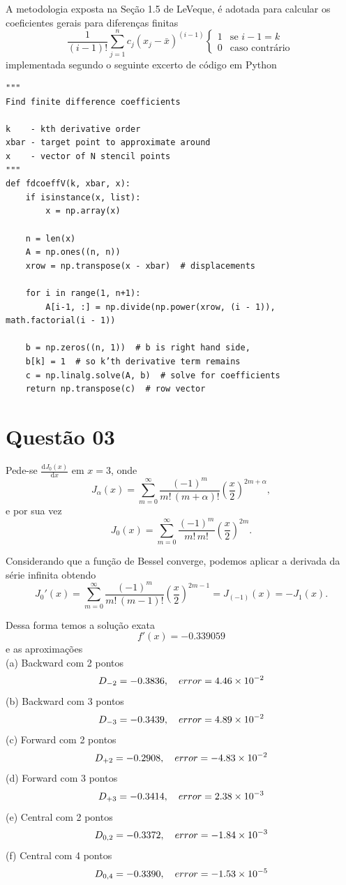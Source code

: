 \documentclass{article}
\begin{document}
A metodologia exposta na Seção 1.5 de LeVeque\cite{leveque}, é adotada para calcular os coeficientes gerais para diferenças finitas
\begin{equation}\label{eq:leveque_coeffs}
\frac{1}{(i-1)!}\sum_{j=1}^n c_j(x_j-\bar{x})^{(i-1)}\begin{cases}
			1 &\text{se $i-1 = k$} \\
                        0 &\text{caso contrário}\
                    \end{cases}
\end{equation}
implementada segundo o seguinte excerto de código em Python
\begin{lstlisting}
"""
Find finite difference coefficients

k    - kth derivative order
xbar - target point to approximate around
x    - vector of N stencil points
"""
def fdcoeffV(k, xbar, x):
    if isinstance(x, list):
        x = np.array(x)

    n = len(x)
    A = np.ones((n, n))
    xrow = np.transpose(x - xbar)  # displacements

    for i in range(1, n+1):
        A[i-1, :] = np.divide(np.power(xrow, (i - 1)), math.factorial(i - 1))

    b = np.zeros((n, 1))  # b is right hand side,
    b[k] = 1  # so k’th derivative term remains
    c = np.linalg.solve(A, b)  # solve for coefficients
    return np.transpose(c)  # row vector

\end{lstlisting}

\section{Questão 03}

Pede-se $\frac{\mathrm{d}J_0(x)}{\mathrm{d}x}$ em $x=3$, onde 
\[J_\alpha(x) = \sum_{m=0}^\infty \frac{(-1)^m}{m!\, (m+\alpha)!} {\left(\frac{x}{2}\right)}^{2m+\alpha},\]
e por sua vez
\[J_0(x) = \sum_{m=0}^\infty \frac{(-1)^m}{m!\, m!} {\left(\frac{x}{2}\right)}^{2m}.\]

Considerando que a função de Bessel converge, podemos aplicar a derivada da série infinita obtendo
\[J_0'(x) = \sum_{m=0}^\infty \frac{(-1)^m}{m!\, (m-1)!} {\left(\frac{x}{2}\right)}^{2m-1} = J_{(-1)}(x) = -J_1(x).\]

Dessa forma temos a solução exata
\[
 f'(x) = -0.339059
 \]
 e as aproximações\\
(a) Backward com 2 pontos
\[D_{-2} = -0.3836, \quad error = \num{4.46E-02} \]
(b) Backward com 3 pontos
\[D_{-3} = -0.3439, \quad error = \num{4.89E-02} \]
(c) Forward com 2 pontos
\[D_{+2} = -0.2908, \quad error = \num{-4.83E-02} \]
(d) Forward com 3 pontos
\[D_{+3} = -0.3414, \quad error = \num{2.38E-03} \]
(e) Central com 2 pontos
\[D_{0, 2} = -0.3372, \quad error = \num{-1.84E-03} \]
(f) Central com 4 pontos
\[D_{0, 4} = -0.3390, \quad error = \num{-1.53E-05} \]
\end{document}
